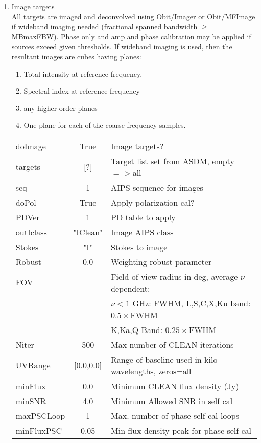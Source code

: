 \documentclass[11pt]{article}
\begin{document}
\begin{enumerate}
%
\item Image targets \\
All targets are imaged and deconvolved using Obit/Imager or
Obit/MFImage if wideband imaging needed (fractional spanned bandwidth
$\ge$ MBmaxFBW).
Phase only and amp and phase calibration may be applied if sources
exceed given thresholds.
If wideband imaging is used, then the resultant images are cubes
having planes:
\begin{enumerate}
\item Total intensity at reference frequency.
\item Spectral index at reference frequency
\item any higher order planes
\item One plane for each of the coarse frequency samples.
\end{enumerate}
\begin{center}
\begin{tabular}{|l|c|l|}
\hline
doImage     & True     & Image targets? \\
targets     & [?]       & Target list set from ASDM, empty$=>$all\\
seq         & 1        & AIPS sequence for images \\
doPol       & True     & Apply polarization cal?\\
PDVer       &  1       & PD table to apply\\
outIclass   & "IClean" & Image AIPS class\\
Stokes      & "I"      & Stokes to image \\
Robust      & 0.0      & Weighting robust parameter\\
FOV         &          & Field of view radius in deg, average $\nu$ dependent:\\
            &          & $\nu<1$ GHz: FWHM, L,S,C,X,Ku band: $0.5\times$FWHM\\
            &          & K,Ka,Q Band: $0.25\times$FWHM\\
Niter       & 500      & Max number of CLEAN iterations\\
UVRange     & [0.0,0.0]& Range of baseline used in kilo wavelengths, zeros=all\\
minFlux     & 0.0      & Minimum CLEAN flux density (Jy) \\
minSNR      & 4.0      & Minimum Allowed SNR in self cal\\
maxPSCLoop  & 1        & Max. number of phase self cal loops\\
minFluxPSC  & 0.05     & Min flux density peak for phase self cal\\

\end{tabular}
\end{center}
\end{enumerate}
\end{document}
